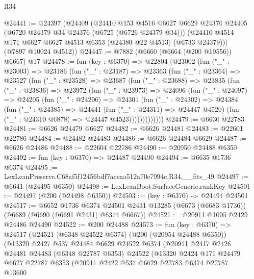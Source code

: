 \begin{lexlean}{R34}
\begin{coremodule}
@24441 := @24397
    (@24409
      (@24410
        @153
        @4516
        @6627
        @6629
        @24376
        @24405
        (@6720 @24379 @34 @24376 (@6725 (@6726 @24379 @34)))
        (@24410 @4514 @171 @6627 @6627 @4513 @6353 (@24380 @22 @4513) (@6733 @24379)))
      (@7897 @10024 @4512))
@24447 := @7882 (@6660 (@6664 (@200 @19556)) @6667) @17
@24478 := fun (key : @6370) =>
  @22804
    (@23002
      (fun ("_" : @23003) =>
      @23186
        (fun ("_" : @23187) =>
        @23363
          (fun ("_" : @23364) =>
          @23527
            (fun ("_" : @23528) =>
            @23687
              (fun ("_" : @23688) =>
              @23835
                (fun ("_" : @23836) =>
                @23972
                  (fun ("_" : @23973) =>
                  @24096
                    (fun ("_" : @24097) =>
                    @24205
                      (fun ("_" : @24206) =>
                      @24301
                        (fun ("_" : @24302) =>
                        @24384
                          (fun ("_" : @24385) =>
                          @24441
                            (fun ("_" : @24311) => @24447 @4520)
                            (fun ("_" : @24310 @6878) => @24447 @4523)))))))))))))
@24479 := @6630 @22783
@24481 := @6626 @24479 @6627
@24482 := @6626 @24481
@24483 := @22601 @22786
@24484 := @24482 @24483
@24486 := @6626 @24484 @6629
@24487 := @6626 @24486
@24488 := @22604 @22786
@24490 := @20950 @24488 @6350
@24492 := fun (key : @6370) => @24487 @24490
@24494 := @6635 @1736 @6374
@24495 := LexLeanPreserve.C68af5f12456bdf7aceaa512a70e7994c.R34.__fits_49
@24497 := @6641 (@24495 @6350)
@24498 := LexLeanBoot.SurfaceGeneric.rankKey
@24501 := @24497 (@200 (@24498 @6350))
@24503 := (key : @6370) -> @24494 @24501
@24517 := @6652
    @1736
    @6374
    @24501
    @2431
    @13285
    (@6673 (@6683 @1736))
    (@6689 (@6690 (@6691 @2431) @6374 @6667))
@24521 := @20911 @1005 @2429 @24486 @24490
@24522 := @200 @24488
@24573 := fun (key : @6370) =>
  @24517
    (@24521
      (@6348 @24522 @6374)
      (@200 (@20954 @24488 @6350))
      (@13320
        @2427
        @537
        @24484
        @6629
        @24522
        @6374
        (@20911
          @2417
          @2426
          @24481
          @24483
          (@6348 @22787 @6353)
          @24522
          (@13320
            @2424
            @171
            @24479
            @6627
            @22787
            @6353
            (@20911
              @2422
              @537
              @6629
              @22783
              @6374
              @22787
              @13600

\end{coremodule}
\end{lexlean}
